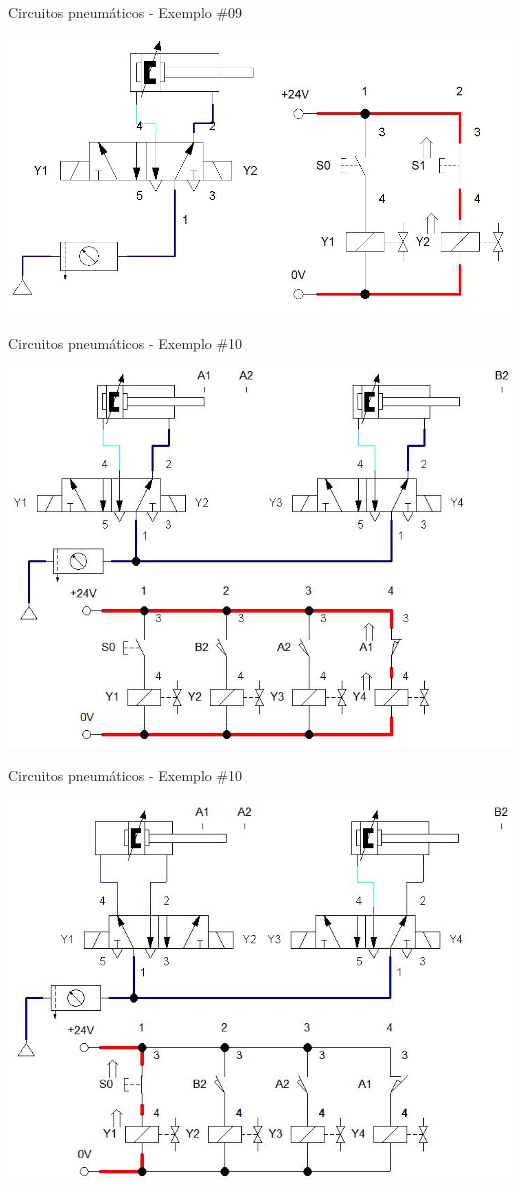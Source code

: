 \begin{frame}{Circuitos pneumáticos - Exemplo \#09}
	
	\centering
	\includegraphics[height=0.8\textheight]{Figuras/Ch14/fig51n4}
	
\end{frame}


\begin{frame}{Circuitos pneumáticos - Exemplo \#10}
	
	\medskip
	\centering
	
	\includegraphics[width=0.8\linewidth]{Figuras/Ch14/fig52}
	
\end{frame}


\begin{frame}{Circuitos pneumáticos - Exemplo \#10}
	
	\centering
	\includegraphics[width=0.8\linewidth]{Figuras/Ch14/fig52n2}
	
\end{frame}


